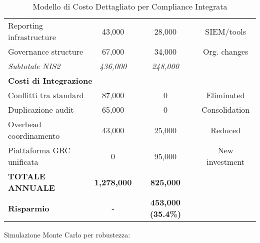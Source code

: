 \begin{table}[H]
\begin{tabular}{lccc}
Reporting infrastructure & 43,000 & 28,000 & SIEM/tools \\
Governance structure & 67,000 & 34,000 & Org. changes \\
\textit{Subtotale NIS2} & \textit{436,000} & \textit{248,000} & \\
\midrule
\multicolumn{4}{l}{\textbf{Costi di Integrazione}} \\
Conflitti tra standard & 87,000 & 0 & Eliminated \\
Duplicazione audit & 65,000 & 0 & Consolidation \\
Overhead coordinamento & 43,000 & 25,000 & Reduced \\
Piattaforma GRC unificata & 0 & 95,000 & New investment \\
\midrule
\textbf{TOTALE ANNUALE} & \textbf{1,278,000} & \textbf{825,000} & \\
\textbf{Risparmio} & - & \textbf{453,000 (35.4\%)} & \\
\bottomrule
\end{tabular}
\caption{Modello di Costo Dettagliato per Compliance Integrata}
\end{table}

Simulazione Monte Carlo per robustezza:

